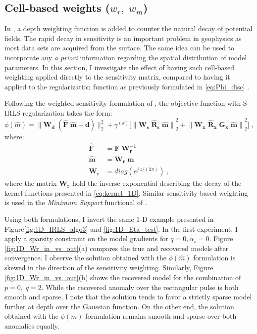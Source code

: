 \subsection{Cell-based weights (${w}_r,\; w_m$)}\label{Wr_Section}
In \cite{LiOldenburg1996}, a depth weighting function is added to counter the natural decay of potential fields. 
The rapid decay in sensitivity is an important problem in geophysics as most data sets are acquired from the surface.
The same idea can be used to incorporate any \emph{a priori} information regarding the spatial distribution of model parameters.
In this section, I investigate the effect of having such cell-based weighting applied directly to the sensitivity matrix, compared to having it applied to the regularization function as previously formulated in \ref{eq:Phi_disc} .

Following the weighted sensitivity formulation of \cite{LiOldenburg1996}, the objective function with S-IRLS regularization takes the form:
\begin{equation} \label{eq:phi_Wrm}
 \phi(\hat m) = \|\mathbf{W_d \;(\hat F\; \hat m - d)}\|_2^{2} + \gamma^{(k)} \Big [ {\|\mathbf{W_\text{s}  \;\hat R_\text{s} \; \hat m}\|}^2_2  +   {\|\mathbf{  W_\text{x}  \;\hat R_\text{x} \; G_\text{x} \; \hat m}\|}^2_2  \Big ] \;,
 \end{equation}
 where:
\begin{equation*}
\begin{split}
\mathbf{\hat F} &= \mathbf{F\;W_\text{r}^{-1}} \\
\mathbf{\hat m} &= \mathbf{W_\text{r}\;m} \\
\mathbf{W_\text{r}} &= diag \left( e^{j\: z / (2 \pi)} \right )\;,
\end{split}
\end{equation*}
where the matrix $\mathbf{W_\text{r}}$ hold the inverse exponential describing the decay of the kernel functions presented in \ref{eq:kernel_1D}.  
Similar sensitivity based weighting is used in the \textit{Minimum Support} functional of \cite{PortniaguineZhdanov02}.

Using both formulations, I invert the same 1-D example presented in Figure\ref{fig:1D_IRLS_algo3} and \ref{fig:1D_Eta_test}.
In the first experiment, I apply a sparsity constraint on the model gradients for $q=0, \alpha_s =0$. 
Figure \ref{fig:1D_Wr_in_vs_out}(a) compares the true and recovered models after convergence.
I observe the solution obtained with the $\phi({\hat m})$ formulation is skewed in the direction of the sensitivity weighting.
Similarly, Figure \ref{fig:1D_Wr_in_vs_out}(b) shows the recovered model for the combination of $p= 0,\;q=2$.
While the recovered anomaly over the rectangular pulse is both smooth and sparse, I note that the solution tends to favor a strictly sparse model further at depth over the Gaussian function.
On the other end, the solution obtained with the $\phi({m})$ formulation remains smooth and sparse over both anomalies equally.

